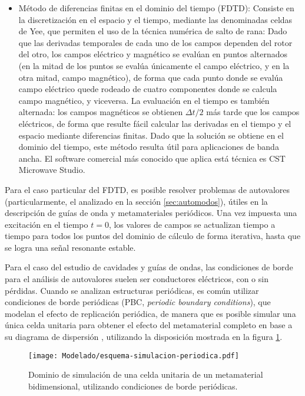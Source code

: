 \begin{itemize}
	\item Método de diferencias finitas en el dominio del tiempo (FDTD): Consiste en la discretización en el espacio y el tiempo, mediante las denominadas celdas de Yee, que permiten el uso de la técnica numérica de salto de rana: Dado que las derivadas temporales de cada uno de los campos dependen del rotor del otro, los campos eléctrico y magnético se evalúan en puntos alternados (en la mitad de los puntos se evalúa únicamente el campo eléctrico, y en la otra mitad, campo magnético), de forma que cada punto donde se evalúa campo eléctrico quede rodeado de cuatro componentes donde se calcula campo magnético, y viceversa. La evaluación en el tiempo es también alternada: los campos magnéticos se obtienen $\Delta t/2$ más tarde que los campos eléctricos, de forma que resulte fácil calcular las derivadas en el tiempo y el espacio mediante diferencias finitas. Dado que la solución se obtiene en el dominio del tiempo, este método resulta útil para aplicaciones de banda ancha. El software comercial más conocido que aplica está técnica es CST Microwave Studio.
\end{itemize}

Para el caso particular del FDTD, es posible resolver problemas de autovalores (particularmente, el analizado en la sección \ref{sec:automodos}), útiles en la descripción de guías de onda y metamateriales periódicos. Una vez impuesta una excitación en el tiempo $t=0$, los valores de campos se actualizan tiempo a tiempo para todos los puntos del dominio de cálculo de forma iterativa, hasta que se logra una señal resonante estable.

Para el caso del estudio de cavidades y guías de ondas, las condiciones de borde para el análisis de autovalores suelen ser conductores eléctricos, con o sin pérdidas. Cuando se analizan estructuras periódicas, es común utilizar condiciones de borde periódicas (PBC, \textit{periodic boundary conditions}), que modelan el efecto de replicación periódica, de manera que es posible simular una única celda unitaria para obtener el efecto del metamaterial completo en base a su diagrama de dispersión \cite{Yang:EBGAntennas}, utilizando la disposición mostrada en la figura \ref{fig:esquema-simulacion-periodica}.

\begin{figure}[h]
	\centering
	\texttt{[image: Modelado/esquema-simulacion-periodica.pdf]}
	\caption{Dominio de simulación de una celda unitaria de un metamaterial bidimensional, utilizando condiciones de borde periódicas.}
	\label{fig:esquema-simulacion-periodica}
\end{figure}

